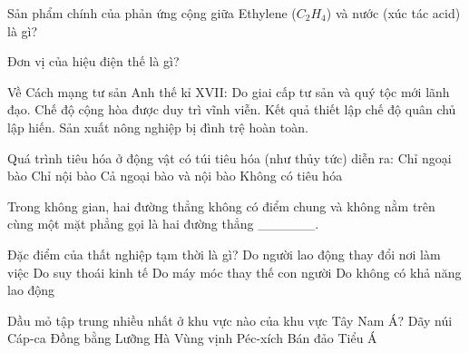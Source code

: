 \begin{ex}
    Sản phẩm chính của phản ứng cộng giữa Ethylene ($C_2H_4$) và nước (xúc tác acid) là gì?

\end{ex}

\begin{ex}
    Đơn vị của hiệu điện thế là gì?
\end{ex}

\begin{ex}
    Về Cách mạng tư sản Anh thế kỉ XVII:
    \choiceTF
    {\True Do giai cấp tư sản và quý tộc mới lãnh đạo.}
    {Chế độ cộng hòa được duy trì vĩnh viễn.}
    {\True Kết quả thiết lập chế độ quân chủ lập hiến.}
    {Sản xuất nông nghiệp bị đình trệ hoàn toàn.}
\end{ex}

\begin{ex}
    Quá trình tiêu hóa ở động vật có túi tiêu hóa (như thủy tức) diễn ra:
    \choice
    {Chỉ ngoại bào}
    {Chỉ nội bào}
    {\True Cả ngoại bào và nội bào}
    {Không có tiêu hóa}
\end{ex}

\begin{ex}
    Trong không gian, hai đường thẳng không có điểm chung và không nằm trên cùng một mặt phẳng gọi là hai đường thẳng ______.

\end{ex}

\begin{ex}
    Đặc điểm của thất nghiệp tạm thời là gì?
    \choice
    {\True Do người lao động thay đổi nơi làm việc}
    {Do suy thoái kinh tế}
    {Do máy móc thay thế con người}
    {Do không có khả năng lao động}
\end{ex}

\begin{ex}
    Dầu mỏ tập trung nhiều nhất ở khu vực nào của khu vực Tây Nam Á?
    \choice
    {Dãy núi Cáp-ca}
    {Đồng bằng Lưỡng Hà}
    {\True Vùng vịnh Péc-xích}
    {Bán đảo Tiểu Á}
\end{ex}

